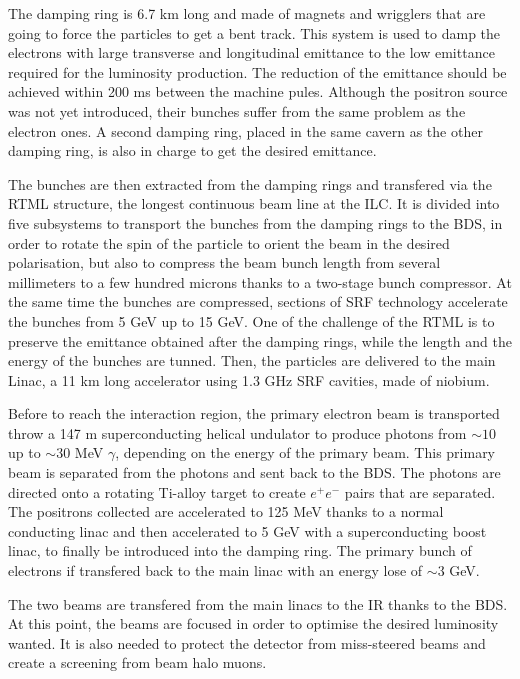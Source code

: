     The damping ring is 6.7 km long and made of magnets and wrigglers that are going to force the particles to get a bent track.
    This system is used to damp the electrons with large transverse and longitudinal emittance to the low emittance required for the luminosity production.
    The reduction of the emittance should be achieved within 200 ms between the machine pules.
    Although the positron source was not yet introduced, their bunches suffer from the same problem as the electron ones. 
    A second damping ring, placed in the same cavern as the other damping ring, is also in charge to get the desired emittance.

    The bunches are then extracted from the damping rings and transfered via the \gls{RTML} structure, the longest continuous beam line at the \gls{ILC}.
    It is divided into five subsystems to transport the bunches from the damping rings to the \gls{BDS}, in order to rotate the spin of the particle to orient the beam in the desired polarisation, but also to compress the beam bunch length from several millimeters to a few hundred microns thanks to a two-stage bunch compressor.
    At the same time the bunches are compressed, sections of \gls{SRF} technology accelerate the bunches from 5 GeV up to 15 GeV.
    One of the challenge of the \gls{RTML} is to preserve the emittance obtained after the damping rings, while the length and the energy of the bunches are tunned.
    Then, the particles are delivered to the main Linac, a 11 km long accelerator using 1.3 GHz \gls{SRF} cavities, made of niobium.

    Before to reach the interaction region, the primary electron beam is transported throw a 147 m superconducting helical undulator to produce photons from $\sim 10$ up to $\sim 30$ MeV $\gamma$, depending on the energy of the primary beam.
    This primary beam is separated from the photons and sent back to the \gls{BDS}.
    The photons are directed onto a rotating Ti-alloy target to create $e^+e^-$ pairs that are separated.
    The positrons collected are accelerated to 125 MeV thanks to a normal conducting linac and then accelerated to 5 GeV with a superconducting boost linac, to finally be introduced into the damping ring.
    The primary bunch of electrons if transfered back to the main linac with an energy lose of $\sim 3$ GeV.

    The two beams are transfered from the main linacs to the \gls{IR} thanks to the \gls{BDS}.
    At this point, the beams are focused in order to optimise the desired luminosity wanted.
    It is also needed to protect the detector from miss-steered beams and create a screening from beam halo muons.

